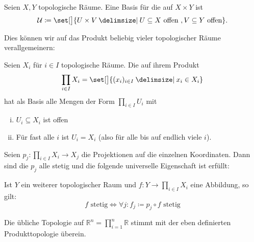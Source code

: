 \begin{definition}[{name=[Produkttopologie]}]
	Seien $X,Y$ topologische Räume. 
	Eine Basis für die  auf $X \times Y$ ist 
	\[
		\mathcal{U} \coloneqq \set[\big]{U \times V \given U \subseteq X \text{ offen }, V \subseteq Y \text{ offen}}. 
	\]
\end{definition}

Dies können wir auf das Produkt beliebig vieler topologischer Räume verallgemeinern:

\begin{definition}[{name=[Produkttopologie]}]
	Seien $X_i$ für $i \in I$ topologische Räume. Die  auf ihrem Produkt 
	\[
		\prod_{i \in I} X_i = \set[\big]{(x_i)_{i \in I} \given x_i \in X_i} 
	\]
	hat als Basis alle Mengen der Form $\prod_{i \in I} U_i$ mit
	\begin{enumerate}[(i)]
		\item $U_i \subseteq X_i$ ist offen
		\item Für fast alle $i$ ist $U_i = X_i$ (also für alle bis auf endlich viele $i$).
	\end{enumerate}
\end{definition}

\begin{bemerkung}[{name=[universelle Eigenschaft der Produkttopologie]}]
	Seien $p_j \colon \prod_{i \in I} X_i \to X_j$ die Projektionen auf die einzelnen Koordinaten. 
	Dann sind die $p_j$ alle stetig und die folgende universelle Eigenschaft ist erfüllt:
	
	Ist $Y$ ein weiterer topologischer Raum und $f \colon Y \to \prod_{i \in I} X_i$ eine Abbildung, so gilt:
	\[
		f \text{ stetig} \iff \forall j : f_j \coloneqq  p_j \circ f \text{ stetig} 
	\]
\end{bemerkung}

\begin{bemerkung}[{name=[Topologie des euklidischen Raumes]}]
	Die übliche Topologie auf $\mathbb{R}^n = \prod_{i =1}^n \mathbb{R}$ stimmt mit der eben definierten Produkttopologie überein.
\end{bemerkung}


